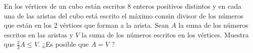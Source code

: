 En los vértices de un cubo están escritos $8$ enteros positivos distintos y en cada una de
las aristas del cubo está escrito el máximo común divisor de los números que están en los
$2$ vértices que forman a la arista. Sean $A$ la suma de los números escritos en las aristas y
$V$ la suma de los números escritos en los vértices. Muestra que $\frac 23 A \leq V$. ¿Es posible que $A = V$ ?